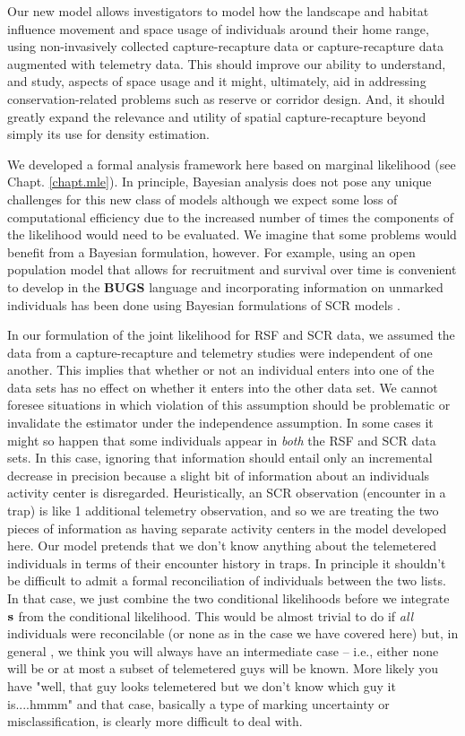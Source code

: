 Our new model allows investigators to model how the landscape and
habitat 
influence movement and space usage of individuals around their home
range, using non-invasively collected capture-recapture data or
capture-recapture data augmented with telemetry data.  This should
improve our ability to understand, and study, aspects of space usage
and it might, ultimately, aid in 
 addressing conservation-related
problems such as reserve or corridor design. And, it should 
greatly expand the relevance and utility of spatial capture-recapture 
beyond simply its use for density estimation.

We developed a formal analysis framework here based on 
marginal likelihood \citep{borchers_efford:2008}
(see Chapt. \ref{chapt.mle}).
In principle,
Bayesian analysis does not pose any unique challenges for this new
class of models although we expect some loss of computational
efficiency due to the increased number of times the components of the
likelihood would need to be evaluated.  We imagine that some problems
would benefit from a Bayesian formulation, however. For example, using
an open population model that allows for recruitment and survival over
time \citep{gardner_etal:2010} is convenient to develop in the {\bf
  BUGS} language and incorporating information on unmarked individuals
has been done using Bayesian formulations of SCR models
\citep{chandler_royle:2012, sollmann_etal:2012}. 

In our formulation of the joint likelihood for RSF and SCR data, we
assumed the data from a capture-recapture and telemetry studies were
independent of one another. This implies that whether or not an
individual enters into one of the data sets has no effect on whether
it enters into the other data set. We cannot foresee situations in
which violation of this assumption should be problematic or invalidate
the estimator under the independence assumption.  In some cases it
might so happen that some individuals appear in {\it both} the RSF and
SCR data sets. In this case, ignoring that information should entail
only an incremental decrease in precision because a slight bit of
information about an individuals activity center is
disregarded. Heuristically, an SCR observation (encounter in a trap)
is like 1 additional telemetry observation, and so we are treating the
two pieces of information as having separate activity centers in the
model developed here.  Our model pretends that we don't know anything
about the telemetered individuals in terms of their encounter history
in traps.  In principle it shouldn't be difficult to admit a formal
reconciliation of individuals between the two lists. In that case, 
we just combine the two conditional
likelihoods before we integrate ${\bf s}$ from the conditional
likelihood. This would be almost trivial 
to do if {\it all} individuals were reconcilable (or none as in the
case we have covered here) but, in general , we think you will always have an
intermediate case -- i.e., either none will be or at most a subset of
telemetered guys will be known. More likely you have "well, that guy
looks telemetered but we don't know which guy it is....hmmm" and that
case, basically a type of marking uncertainty or misclassification, is
clearly more difficult to deal with.


